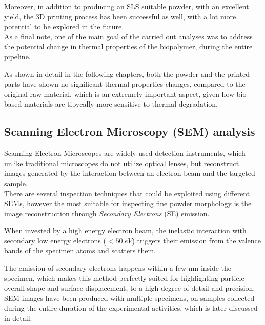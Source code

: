 \documentclass{article}
\begin{document}
    Moreover, in addition to producing an SLS suitable powder, with an excellent yield, the 3D printing process has been successful as well, with 
    a lot more potential to be explored in the future. \\ 

    As a final note, one of the main goal of the carried out analyses was to address the potential change in thermal properties of the biopolymer, during the entire pipeline. 
    
    As shown in detail in the following chapters, both the powder and the printed parts have shown no significant thermal properties changes, compared to the 
    original raw material, which is an extremely important aspect, given how bio-based materials are tipycally more sensitive to thermal degradation. \\ 


    \clearpage
        \subsection{Scanning Electron Microscopy (SEM) analysis\label{SEM_analysis}}

        Scanning Electron Microscopes are widely used detection instruments, which unlike traditional microscopes 
        do not utilize optical lenses, but reconstruct images generated by the interaction between an electron beam and the targeted 
        sample. \\ 

        There are several inspection techniques that could be exploited using different SEMs, however the most suitable for inspecting 
        fine powder morphology is the image reconstruction through \textit{Secondary Electrons} (SE) emission. 

        When invested by a high energy electron beam, the inelastic interaction with secondary low energy electrons ($< 50 \ eV$) triggers their emission from the valence bands of the specimen atoms and scatters them. 

        The emission of secondary electrons happens within a few nm inside the specimen, which makes this method perfectly suited 
        for highlighting particle overall shape and surface displacement, to a high degree of detail and precision. \\

        SEM images have been produced with multiple specimens, on samples collected during the entire duration of the experimental 
        activities, which is later discussed in detail. 
\end{document}
